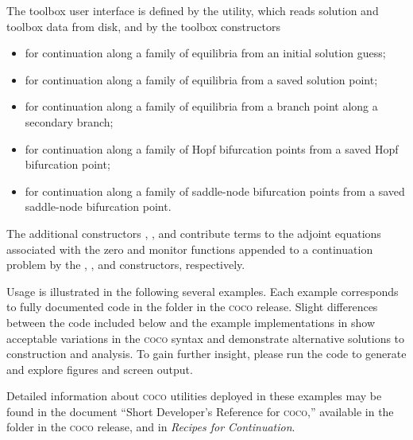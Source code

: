The toolbox user interface is defined by the  utility, which reads solution and toolbox data from disk, and by the toolbox constructors
\begin{itemize}
\item {} for continuation along a family of equilibria from an initial solution guess;
\item {} for continuation along a family of equilibria from a saved solution point;
\item {} for continuation along a family of equilibria from a branch point along a secondary branch;
\item {} for continuation along a family of Hopf bifurcation points from a saved Hopf bifurcation point;
\item {} for continuation along a family of saddle-node bifurcation points from a saved saddle-node bifurcation point.
\end{itemize}
The additional constructors , , and  contribute terms to the adjoint equations associated with the zero and monitor functions appended to a continuation problem by the , , and  constructors, respectively. 

Usage is illustrated in the following several examples. Each example corresponds to fully documented code in the  folder in the \textsc{coco} release. Slight differences between the code included below and the example implementations in  show acceptable variations in the \textsc{coco} syntax and demonstrate alternative solutions to construction and analysis. To gain further insight, please run the code to generate and explore figures and screen output.

Detailed information about \textsc{coco} utilities deployed in these examples may be found in the document ``Short Developer's Reference for \textsc{coco},'' available in the  folder in the \textsc{coco} release, and in \emph{Recipes for Continuation}.




